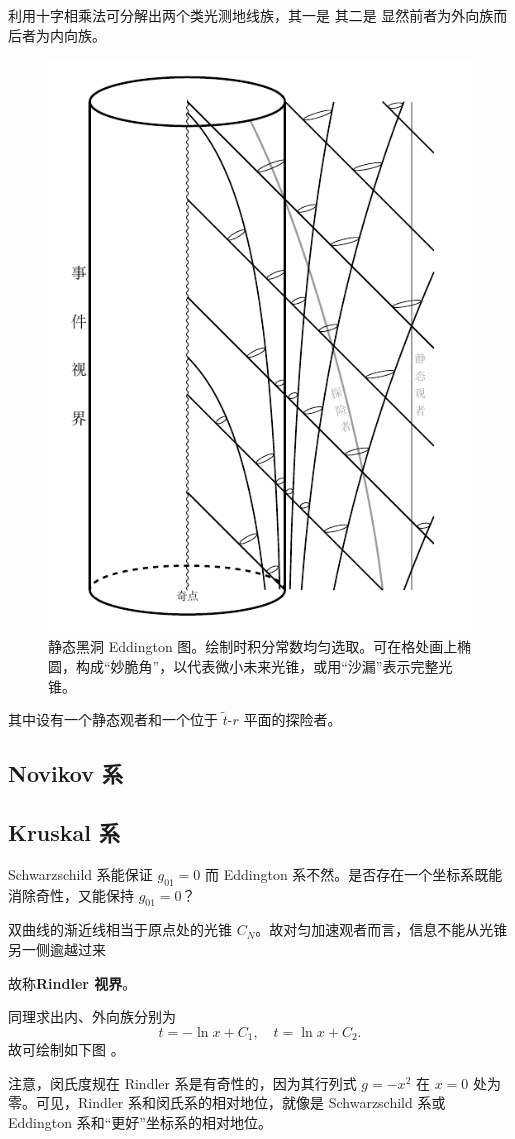 利用十字相乘法可分解出两个类光测地线族，其一是
其二是
显然前者为外向族而后者为内向族。
\begin{figure}[h!]
    \centering
    \includegraphics[width=.6\textwidth]{fig/chpt02/schBH.pdf}
    \caption{\small 静态黑洞 Eddington 图。绘制时积分常数均匀选取。可在格处画上椭圆，构成“妙脆角”，以代表微小未来光锥，或用“沙漏”表示完整光锥。}
\end{figure}
其中设有一个静态观者和一个位于 $\tilde t$-$r$ 平面的探险者。

\subsection{Novikov 系}

\subsection{Kruskal 系}
Schwarzschild 系能保证 $g_{01}=0$ 而 Eddington 系不然。是否存在一个坐标系既能消除奇性，又能保持 $g_{01}=0$？

双曲线的渐近线相当于原点处的光锥 $C_N$。故对匀加速观者而言，信息不能从光锥另一侧逾越过来

故称\textbf{Rindler 视界}。

同理求出内、外向族分别为
\[
t=-\ln x+C_1,\quad t=\ln x+C_2.
\]
故可绘制如下图 。

注意，闵氏度规在 Rindler 系是有奇性的，因为其行列式 $g=-x^2$ 在 $x=0$ 处为零。可见，Rindler 系和闵氏系的相对地位，就像是 Schwarzschild 系或 Eddington 系和“更好”坐标系的相对地位。




